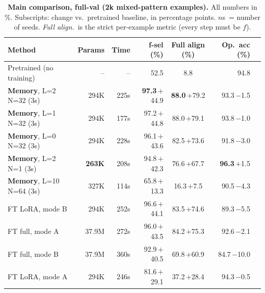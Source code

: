 \documentclass[10pt]{article}
\newcommand{\posv}[1]{\textcolor{good}{$+$#1}}
\newcommand{\negv}[1]{\textcolor{bad}{$-$#1}}
\newcommand{\memv}{\textbf{Memory}}
\begin{document}
\begin{table}[ht]
  \centering\small
  \caption{\textbf{Main comparison, full-val (2k mixed-pattern examples).}
    All numbers in \%. Subscripts: change vs.\ pretrained baseline, in
    percentage points.  $n$s~= number of seeds.  \emph{Full align.}\ is the
    strict per-example metric (every step must be $f$).}
  \label{tab:main}
  \renewcommand{\arraystretch}{1.15}
  \begin{tabular}{lrrrcrc}
    \toprule
    \textbf{Method} & \textbf{Params} & \textbf{Time} &
    \textbf{f-sel (\%)} & \textbf{Full align (\%)} &
    \textbf{Op.\ acc (\%)} & \\
    \midrule
    Pretrained (no training) & -- & -- & 52.5 & 8.8 & 94.8 & \\
    \midrule
    \rowcolor{rowhl}
    \memv, L=2 N=32 (3s) & 294K & 225s &
      \textbf{97.3}\,{\tiny\posv{44.9}} &
      \textbf{88.0}\,{\tiny\posv{79.2}} &
      93.3\,{\tiny\negv{1.5}} & \\
    \rowcolor{rowhl}
    \memv, L=1 N=32 (3s) & 294K & 177s &
      97.2\,{\tiny\posv{44.8}} &
      88.0\,{\tiny\posv{79.1}} &
      93.8\,{\tiny\negv{1.0}} & \\
    \memv, L=0 N=32 (3s) & 294K & 228s &
      96.1\,{\tiny\posv{43.6}} &
      82.5\,{\tiny\posv{73.6}} &
      91.8\,{\tiny\negv{3.0}} & \\
    \memv, L=2 N=1 (3s) & \textbf{263K} & 208s &
      94.8\,{\tiny\posv{42.3}} &
      76.6\,{\tiny\posv{67.7}} &
      \textbf{\textcolor{good}{96.3}}\,{\tiny\posv{1.5}} & \\
    \memv, L=10 N=64 (3s) & 327K & 114s &
      65.8\,{\tiny\posv{13.3}} &
      16.3\,{\tiny\posv{7.5}} &
      90.5\,{\tiny\negv{4.3}} & \\
    \midrule
    FT LoRA, mode B & 294K & 252s &
      96.6\,{\tiny\posv{44.1}} &
      83.5\,{\tiny\posv{74.6}} &
      89.3\,{\tiny\negv{5.5}} & \\
    FT full, mode A & 37.9M & 272s &
      96.0\,{\tiny\posv{43.5}} &
      84.2\,{\tiny\posv{75.3}} &
      92.6\,{\tiny\negv{2.1}} & \\
    FT full, mode B & 37.9M & 360s &
      92.9\,{\tiny\posv{40.5}} &
      69.8\,{\tiny\posv{60.9}} &
      \textcolor{bad}{84.7}\,{\tiny\negv{10.0}} & \\
    FT LoRA, mode A & 294K & 246s &
      81.6\,{\tiny\posv{29.1}} &
      37.2\,{\tiny\posv{28.4}} &
      94.3\,{\tiny\negv{0.5}} & \\
    \bottomrule
  \end{tabular}
\end{table}
\end{document}
